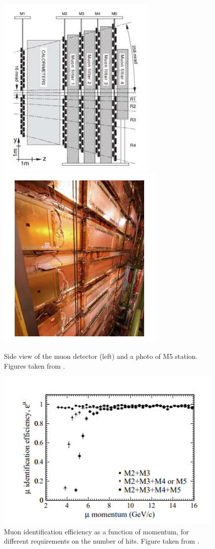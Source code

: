 \begin{figure}[h]
 \begin{center}
  \includegraphics[width=0.49\linewidth]{figures/muon_stations.PNG}
   \includegraphics[width=0.49\linewidth]{figures/muon_photo.PNG}
    \caption{Side view of the muon detector (left) and a photo of M5 station. Figures taken from \cite{lhcb}.}%
    \label{fig:muon}%
 \end{center}
\end{figure}



\begin{figure}[h]
\centering
\includegraphics[scale=0.6]{figures/muon_eff.PNG}
\caption{Muon identification efficiency as a function of momentum, for different requirements on the number of hits. Figure taken from \cite{muon_tdr}.
\label{fig:muon_missidentify}}
\end{figure}



